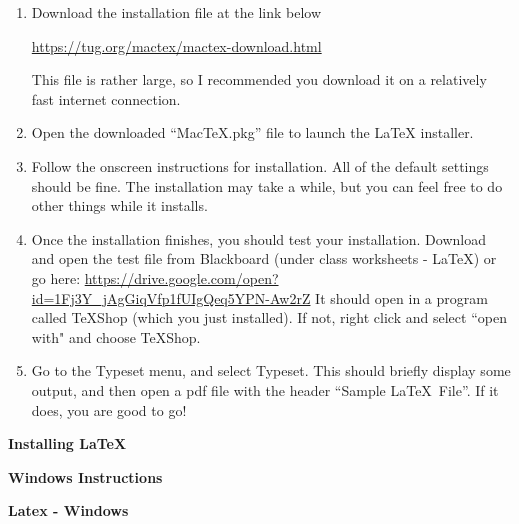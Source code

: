 \documentclass[a4paper,12pt]{letter}
\begin{document}
\begin{enumerate}
\item Download the installation file at the link below %
\begin{center}
\url{https://tug.org/mactex/mactex-download.html}
\end{center}
This file is rather large, so I recommended you download it on a relatively fast internet connection.  
\item Open the downloaded ``MacTeX.pkg'' file to launch the LaTeX installer.  
\item Follow the onscreen instructions for installation.  All of the default settings should be fine.  The installation may take a while, but you can feel free to do other things while it installs.  
\item Once the installation finishes, you should test your installation.  Download and open the test file from Blackboard (under class worksheets - LaTeX) or go here: \url{https://drive.google.com/open?id=1Fj3Y_jAgGiqVfp1fUIgQeq5YPN-Aw2rZ}
It should open in a program called TeXShop (which you just installed).  If not, right click and select ``open with" and choose TeXShop.
\item Go to the Typeset menu, and select Typeset.  This should briefly display some output, and then open a pdf file with the header ``Sample \LaTeX\,  File''.  If it does, you are good to go!  
\end{enumerate}

\pagebreak

\begin{center}
{\bf Installing \LaTeX}

\vspace{-2mm}

\end{center}

\begin{center}
{\bf Windows Instructions}
\end{center}


\begin{center}
{\bf Latex - Windows}
\end{center}
\end{document}
